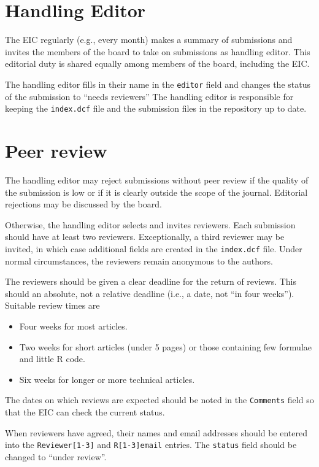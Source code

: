 \documentclass[11pt]{article}
\begin{document}
\section{Handling Editor}

The EIC regularly (e.g., every month) makes a summary of submissions
and invites the members of the board to take on submissions as
handling editor. This editorial duty is shared equally among members
of the board, including the EIC.

The handling editor fills in their name in the \texttt{editor} field
and changes the status of the submission to ``needs reviewers'' The
handling editor is responsible for keeping the \texttt{index.dcf} file
and the submission files in the repository up to date.

\section{Peer review}

The handling editor may reject submissions without peer review if the
quality of the submission is low or if it is clearly outside the scope
of the journal. Editorial rejections may be discussed by the board.

Otherwise, the handling editor selects and invites reviewers. Each
submission should have at least two reviewers. Exceptionally, a third
reviewer may be invited, in which case additional fields are created
in the \texttt{index.dcf} file. Under normal circumstances, the
reviewers remain anonymous to the authors.

The reviewers should be given a clear deadline for the return of
reviews.  This should an absolute, not a relative deadline (i.e., a
date, not ``in four weeks''). Suitable review times are
\begin{itemize}
\item Four weeks for most articles.
\item Two weeks for short articles (under 5 pages) or those containing
few formulae and little R code.
\item Six weeks for longer or more technical articles.
\end{itemize}
The dates on which reviews are expected should be noted in the
\texttt{Comments} field so that the EIC can check the current status.

When reviewers have agreed, their names and email addresses should
be entered into the \verb+Reviewer[1-3]+ and \verb+R[1-3]email+ entries.
The \texttt{status} field should be changed to ``under review''.
\end{document}
